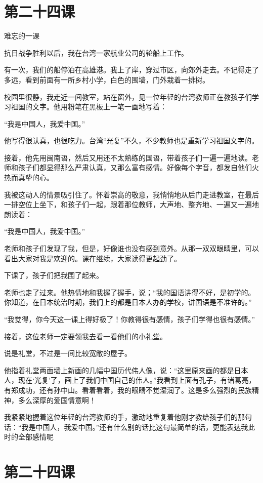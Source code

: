 \documentclass[12pt,UTF8]{ctexbook}
\begin{document}
\section{第二十四课}

难忘的一课

抗日战争胜利以后，我在台湾一家航业公司的轮船上工作。

有一次，我们的船停泊在高雄港。我上了岸，穿过市区，向郊外走去。不记得走了多远，看到前面有一所乡村小学，白色的围墙，门外栽着一排树。

校园里很静，我走近一间教室，站在窗外，见一位年轻的台湾教师正在教孩子们学习祖国的文字。他用粉笔在黑板上一笔一画地写着：

“我是中国人，我爱中国。”

他写得很认真，也很吃力。台湾“光复”不久，不少教师也是重新学习祖国文字的。

接着，他先用闽南语，然后又用还不太熟练的国语，带着孩子们一遍一遍地读。老师和孩子们都显得那么严肃认真，又那么富有感情。好像每个字音，都发自他们火热而真挚的心。

我被这动人的情景吸引住了。怀着崇高的敬意，我悄悄地从后门走进教室，在最后一排空位上坐下，和孩子们一起，跟着那位教师，大声地、整齐地、一遍又一遍地朗读着：

“我是中国人，我爱中国。”

老师和孩子们发现了我，但是，好像谁也没有感到意外。从那一双双眼睛里，可以看出大家对我是欢迎的。课在继续，大家读得更起劲了。

下课了，孩子们把我围了起来。

老师也走了过来。他热情地和我握了握手，说；“我的国语讲得不好，是初学的。你知道，在日本统治时期，我们上的都是日本人办的学校，讲国语是不准许的。”

“我觉得，你今天这一课上得好极了！你教得很有感情，孩子们学得也很有感情。”

接着，这位老师一定要领我去看一看他们的小礼堂。

说是礼堂，不过是一间比较宽敞的屋子。

他指着礼堂两面墙上新画的几幅中国历代伟人像，说：“这里原来画的都是日本人，现在‘光复’了，画上了我们中国自己的伟人。”我看到上面有孔子，有诸葛亮，有郑成功，还有孙中山。看着看着，我的眼睛不觉湿润了。这是多么强烈的民族精神，多么深厚的爱国情意啊！

我紧紧地握着这位年轻的台湾教师的手，激动地重复着他刚才教给孩子们的那句话：“我是中国人，我爱中国。”还有什么别的话比这句最简单的话，更能表达我此时的全部感情呢

\section{第二十四课}
\end{document}
